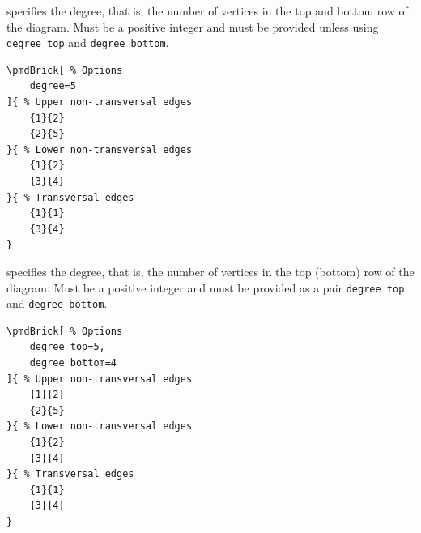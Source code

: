 \documentclass{ltxdoc}
\begin{document}
specifies the degree, that is, the number of vertices in the top and bottom row of the diagram. Must be a positive integer and must be provided unless using \texttt{degree top} and \texttt{degree bottom}.
\begin{center}
    \begin{minipage}{\dimexpr0.85\textwidth-2\fboxrule-2\fboxsep\relax}
        \begin{minipage}[c]{0.4\linewidth}
\begin{verbatim}
\pmdBrick[ % Options
    degree=5
]{ % Upper non-transversal edges
    {1}{2}
    {2}{5}
}{ % Lower non-transversal edges
    {1}{2}
    {3}{4}
}{ % Transversal edges
    {1}{1}
    {3}{4}
}
\end{verbatim}
        \end{minipage}
        \hfill
        \begin{minipage}[c]{0.4\linewidth}
        \end{minipage}
    \end{minipage}%
\end{center}

 
specifies the degree, that is, the number of vertices in the top (bottom) row of the diagram. Must be a positive integer and must be provided as a pair \texttt{degree top} and \texttt{degree bottom}.
\begin{center}
    \begin{minipage}{\dimexpr0.85\textwidth-2\fboxrule-2\fboxsep\relax}
        \begin{minipage}[c]{0.4\linewidth}
\begin{verbatim}
\pmdBrick[ % Options
    degree top=5,
    degree bottom=4
]{ % Upper non-transversal edges
    {1}{2}
    {2}{5}
}{ % Lower non-transversal edges
    {1}{2}
    {3}{4}
}{ % Transversal edges
    {1}{1}
    {3}{4}
}
\end{verbatim}
        \end{minipage}
        \hfill
        \begin{minipage}[c]{0.4\linewidth}
        \end{minipage}
    \end{minipage}%
\end{center}
\end{document}
